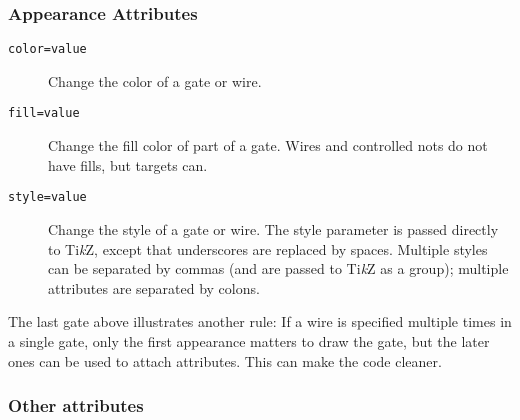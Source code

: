 \documentclass[twoside,12pt]{article}
\newcommand{\TikZ}{Ti\emph{k}Z\xspace}
\begin{document}
\subsubsection{Appearance Attributes}

\begin{description}
\item[{\tt color=value}] Change the color of a gate or wire.

\begin{minipage}[b]{3in}

\end{minipage} \hfill 

\item[{\tt fill=value}] Change the fill color of part of a gate.  Wires and
  controlled nots do not have fills, but targets can.

\begin{minipage}[b]{3.3in}

\end{minipage} \hfill 

\item[{\tt style=value}] Change the style of a gate or wire.  The style parameter is passed directly to \TikZ,
  except that underscores are replaced by spaces.  Multiple styles can be separated
  by commas (and are passed to \TikZ as a group); multiple attributes are separated by
  colons.

\begin{minipage}[b]{3in}

\end{minipage} \hfill 

\end{description}

The last gate above illustrates another rule:
If a wire is specified multiple times in a single gate, only the first
appearance matters to draw the gate, but the later ones can be used to attach
attributes.  This can make the code cleaner.

\begin{minipage}[b]{3in}

\end{minipage} \hfill 

\subsubsection{Other attributes}
\end{document}
